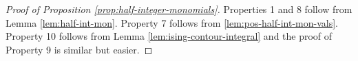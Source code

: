 \documentclass[12pt,oneside,english]{amsart}
\numberwithin{equation}{section}
\numberwithin{figure}{section}
\theoremstyle{plain}
\theoremstyle{plain}
\theoremstyle{plain}
\theoremstyle{plain}
\theoremstyle{remark}
\theoremstyle{definition}
\theoremstyle{plain}
\theoremstyle{plain}
\newtheorem*{prop*}{\protect\propositionname}
\numberwithin{thm}{section}
\providecommand{\propositionname}{Proposition}
\providecommand{\propositionname}{Proposition}
\providecommand{\propositionname}{Proposition}
\providecommand{\propositionname}{Proposition}
\begin{document}

\begin{proof}[Proof of Proposition \ref{prop:half-integer-monomials}]
Properties 1 and 8 follow from Lemma \ref{lem:half-int-mon}.
Property 7 follows from \ref{lem:pos-half-int-mon-vals}. Property
10 follows from Lemma \ref{lem:ising-contour-integral} and the proof of 
Property 9 is similar but easier. 
\end{proof}
\end{document}

